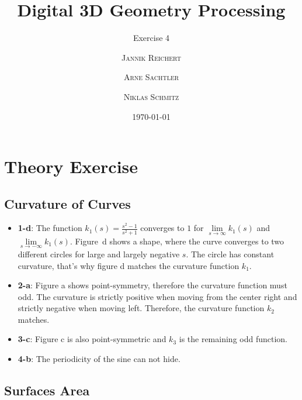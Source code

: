 \documentclass{scrartcl}
\title{Digital 3D Geometry Processing}
\subtitle{Exercise 4}
\author{\textsc{Jannik Reichert} \and \textsc{Arne Sachtler} \and \textsc{Niklas Schmitz}}
\date{\today}
\begin{document}
\maketitle

\section{Theory Exercise}

\subsection{Curvature of Curves}

\begin{itemize}
	\item \textbf{1-d}: The function $k_1(s) = \frac{s^2 -1}{s^2+1}$ converges to $1$ for $\lim\limits_{s \rightarrow \infty} k_1(s)$ and $\lim\limits_{s \rightarrow -\infty} k_1(s)$. Figure~d shows a shape, where the curve converges to two different circles for large and largely negative $s$. The circle has constant curvature, that's why figure d matches the curvature function $k_1$.
	\item \textbf{2-a}: Figure a shows point-symmetry, therefore the curvature function must odd. The curvature is strictly positive when moving from the center right and strictly negative when moving left. Therefore, the curvature function $k_2$ matches.
	\item \textbf{3-c}: Figure c is also point-symmetric and $k_3$ is the remaining odd function.
	\item \textbf{4-b}: The periodicity of the sine can not hide.
\end{itemize}

\subsection{Surfaces Area}
\end{document}
